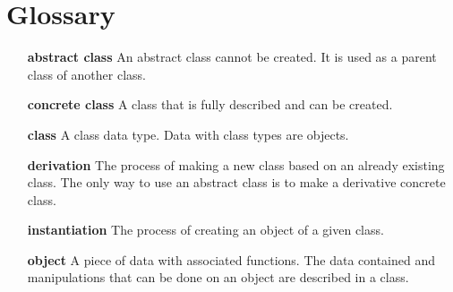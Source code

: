 \documentclass[letterpaper%
              ]{report}
\begin{document}
\chapter*{Glossary}
\label{glossary}

\begin{itemize}
\item[{\bfseries abstract class}]
          An abstract class cannot be created.  It is used
          as a parent class of another class.
\item[{\bfseries concrete class}]
          A class that is fully described and can be created.
\item[{\bfseries class}]
          A class data type.  Data with class types are objects.
\item[{\bfseries derivation}]
          The process of making a new class based on an already
          existing class.  The only way to use an abstract class
          is to make a derivative concrete class.
\item[{\bfseries instantiation}]
          The process of creating an object of a given class.
\item[{\bfseries object}]
          A piece of data with associated functions.  The data
          contained and manipulations that can be done on an object
          are described in a class.
\end{itemize}

\printindex
\end{document}

